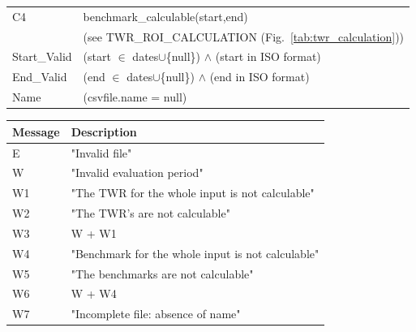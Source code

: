 \documentclass[runningheads,12pt]{article}
\begin{document}
{\begin{longtable}{|l|p{12cm}|}
\hline
C4 & benchmark\_calculable(start,end)\\
&(see TWR\_ROI\_CALCULATION (Fig.~\ref{tab:twr_calculation}))\\

\hline
 Start\_Valid & (start $\in$ dates$\cup$\{null\}) $\wedge$ (start in ISO format)\\

\hline
 End\_Valid & (end $\in$ dates$\cup$\{null\}) $\wedge$ (end in ISO format)\\

\hline
Name & (csvfile.name = null)\\

\hline
\end{longtable}

\centering
\begin{longtable}{|l|p{13cm}|}
\hline
\textbf{Message} & \textbf{Description}\\

\hline
 E & "Invalid file"\\

\hline
W & "Invalid evaluation period"\\

\hline
W1 & "The TWR for the whole input is not calculable"\\

\hline
W2 & "The TWR's are not calculable"\\

\hline
W3 & W + W1\\

\hline
W4 &  "Benchmark for the whole input is not calculable"\\

\hline
W5 & "The benchmarks are not calculable"\\

\hline
W6 & W + W4\\

\hline
W7 & "Incomplete file: absence of name"\\

\hline

\end{longtable}
}
\end{document}
